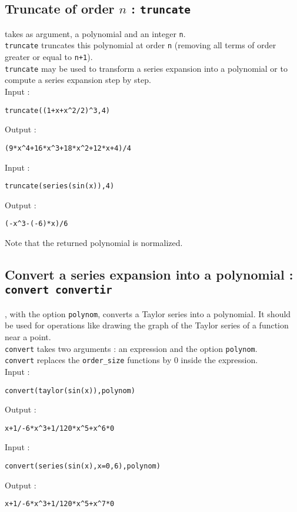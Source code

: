\documentclass[a4paper,11pt]{book}
\begin{document}
\subsection{Truncate of order $n$ : {\tt truncate}}
 takes as argument, a polynomial and an integer 
{\tt n}.\\
{\tt truncate} truncates this polynomial at order {\tt n} (removing
all terms of order greater or equal to {\tt n+1}).\\
{\tt truncate} may be used to transform a series expansion into a 
polynomial or to compute a series expansion step by step.\\
Input :
\begin{center}{\tt truncate((1+x+x\verb|^|2/2)\verb|^|3,4)}\end{center}
Output :
\begin{center}{\tt (9*x\verb|^|4+16*x\verb|^|3+18*x\verb|^|2+12*x+4)/4}\end{center}
Input :
\begin{center}{\tt truncate(series(sin(x)),4)}\end{center}
Output :
\begin{center}{\tt (-x\verb|^|3-(-6)*x)/6}\end{center}
Note that the returned polynomial is normalized.

\subsection{Convert a series expansion into a polynomial : {\tt convert convertir}}\label{sec:convertpoly}
, with the option {\tt polynom}, converts a Taylor series
into a polynomial. It should be used for operations like drawing 
the graph of the Taylor series of a function near a point.\\
{\tt convert} takes two arguments : an expression
and the option {\tt polynom}.\\
{\tt convert} replaces the {\tt order\_size} functions by 0 inside the
expression.\\
Input :
\begin{center}{\tt convert(taylor(sin(x)),polynom)}\end{center}
Output :
\begin{center}{\tt x+1/-6*x\verb|^|3+1/120*\verb|x^|5+x\verb|^|6*0}\end{center}
Input :
\begin{center}{\tt convert(series(sin(x),x=0,6),polynom)}\end{center}
Output :
\begin{center}{\tt x+1/-6*x\verb|^|3+1/120*\verb|x^|5+x\verb|^|7*0}\end{center}
\end{document}
